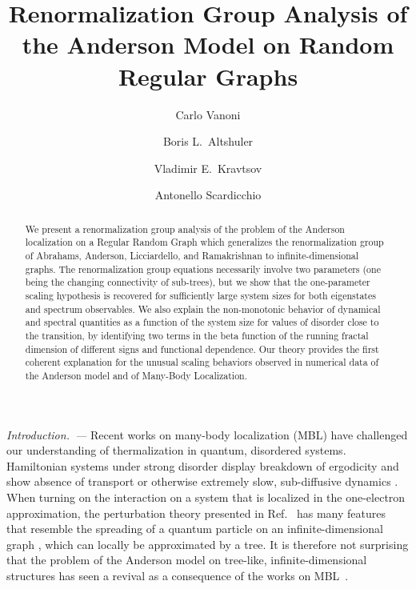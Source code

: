 \documentclass[reprint,aps,prl,superscriptaddress,english,nolongbibliography]{revtex4-2}
\begin{document}
\title{Renormalization Group Analysis of the Anderson Model on Random Regular Graphs}

\author{Carlo Vanoni}
\author{Boris L.\ Altshuler}
\author{Vladimir E.\ Kravtsov}
\author{Antonello Scardicchio}

\begin{abstract}
    We present a renormalization group analysis of the problem of the Anderson localization on a Regular Random Graph which generalizes the renormalization group of Abrahams, Anderson, Licciardello, and Ramakrishnan to infinite-dimensional graphs. The renormalization group equations necessarily involve two parameters (one being the changing connectivity of sub-trees), but we show that the one-parameter scaling hypothesis is recovered for sufficiently large system sizes for both eigenstates and spectrum observables. 
    We also explain the non-monotonic behavior of dynamical and spectral quantities as a function of the system size for values of disorder close to the transition, by identifying two terms in the beta function of the running fractal dimension of different signs and functional dependence. Our theory provides the first coherent explanation for the unusual scaling behaviors observed in numerical data of the Anderson model and of Many-Body Localization.
\end{abstract}

\maketitle

\emph{Introduction.~---}
Recent works on many-body localization (MBL) \cite{Basko06,Pal10,Serbyn13b,ros2015integrals,Nandkishore15,Imbrie17,Abanin2019colloquium} have challenged our understanding of thermalization in quantum, disordered systems. Hamiltonian systems under strong disorder display breakdown of ergodicity and show absence of transport or otherwise extremely slow, sub-diffusive dynamics \cite{vznidarivc2016diffusive}. When turning on the interaction on a system that is localized in the one-electron approximation, the perturbation theory presented in Ref.~\cite{Basko06} has many features that resemble the spreading of a quantum particle on an infinite-dimensional graph \cite{altshuler1997quasiparticle}, which can locally be approximated by a tree. It is therefore not surprising that the problem of the Anderson model on tree-like, infinite-dimensional structures has seen a revival as a consequence of the works on MBL~\cite{de2014anderson,parisi2019anderson,biroli2017delocalized,tikhonov2021AndersonMBL,Lemariè2022critical,baroni2023corrections,Mata2017Scaling,Mata2020two,tikhonov2016fractality}.
\end{document}
